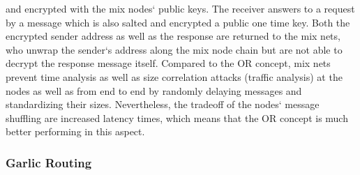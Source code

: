 \documentclass{sig-alternate}
\begin{document}
and encrypted with the mix nodes` public keys. The receiver answers to a request by a message which is also salted and encrypted a public one time key. Both the encrypted sender address as well as the response are returned to the mix nets, who unwrap the sender`s address along the mix node chain but are not able to decrypt the response message itself. Compared to the OR concept, mix nets prevent time analysis as well as size correlation attacks (traffic analysis) at the nodes as well as from end to end by randomly delaying messages and standardizing their sizes. Nevertheless, the tradeoff of the nodes` message shuffling are increased latency times, which means that the OR concept is much better performing in this aspect. 

\subsubsection {Garlic Routing}
\end{document}
